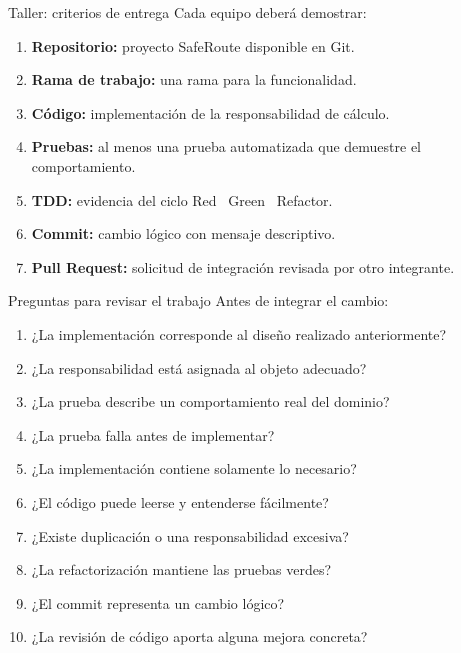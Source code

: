 \documentclass[11pt,aspectratio=169]{beamer}
\begin{document}
\begin{frame}{Taller: criterios de entrega}
Cada equipo deberá demostrar:
\begin{enumerate}
  \item \textbf{Repositorio:} proyecto SafeRoute disponible en Git.
  \item \textbf{Rama de trabajo:} una rama  para la funcionalidad.
  \item \textbf{Código:} implementación de la responsabilidad de cálculo.
  \item \textbf{Pruebas:} al menos una prueba automatizada que demuestre el comportamiento.
  \item \textbf{TDD:} evidencia del ciclo Red \arr\ Green \arr\ Refactor.
  \item \textbf{Commit:} cambio lógico con mensaje descriptivo.
  \item \textbf{Pull Request:} solicitud de integración revisada por otro integrante.
\end{enumerate}
\end{frame}

\begin{frame}{Preguntas para revisar el trabajo}
Antes de integrar el cambio:
\begin{onecol}[width=0.92]
  \begin{enumerate}\small
    \item ¿La implementación corresponde al diseño realizado anteriormente?
    \item ¿La responsabilidad está asignada al objeto adecuado?
    \item ¿La prueba describe un comportamiento real del dominio?
    \item ¿La prueba falla antes de implementar?
    \item ¿La implementación contiene solamente lo necesario?
    \item ¿El código puede leerse y entenderse fácilmente?
    \item ¿Existe duplicación o una responsabilidad excesiva?
    \item ¿La refactorización mantiene las pruebas verdes?
    \item ¿El commit representa un cambio lógico?
    \item ¿La revisión de código aporta alguna mejora concreta?
  \end{enumerate}
\end{onecol}
\end{frame}
\end{document}
